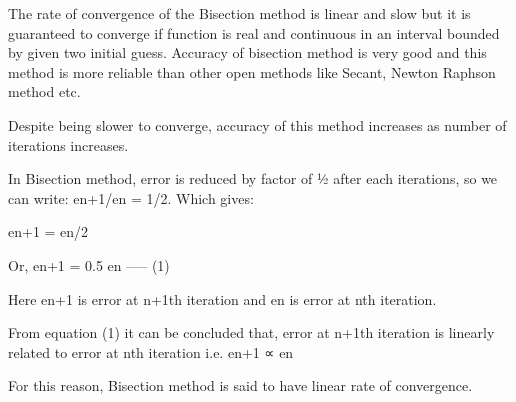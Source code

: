 \documentclass[12pt]{article}
\newcommand{\?}{\stackrel{?}{=}}
\begin{document}
The rate of convergence of the Bisection method is linear and slow but it is guaranteed to converge if function is real and continuous in an interval bounded by given two initial guess.
Accuracy of bisection method is very good and this method is more reliable than other open methods like Secant, Newton Raphson method etc.

Despite being slower to converge, accuracy of this method increases as number of iterations increases.

In Bisection method, error is reduced by factor of ½ after each iterations, so we can write: en+1/en = 1/2. Which gives:

en+1 = en/2

Or, en+1 = 0.5 en ----- (1)

Here en+1 is error at n+1th iteration and en is error at nth iteration.

From equation (1) it can be concluded that, error at n+1th iteration is linearly related to error at nth iteration i.e. en+1 ∝ en

For this reason, Bisection method is said to have linear rate of convergence.
\end{document}
